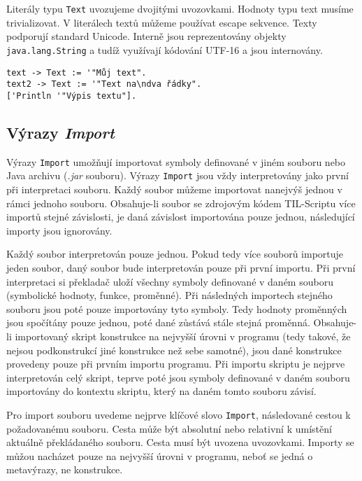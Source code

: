 Literály typu \lstinline{Text} uvozujeme dvojitými uvozovkami. Hodnoty typu text musíme
trivializovat. V literálech textů můžeme používat escape sekvence. Texty podporují standard
Unicode. Interně jsou reprezentovány objekty \lstinline{java.lang.String} a tudíž využívají
kódování UTF-16 a jsou internovány.

\begin{lstlisting}[caption={Příklad využití typu Text}]
text -> Text := '"Můj text".
text2 -> Text := '"Text na\ndva řádky".
['Println '"Výpis textu"].
\end{lstlisting}

\subsection{Výrazy \textit{Import}}

Výrazy \lstinline{Import} umožňují importovat symboly definované v jiném souboru nebo Java archivu
(\textit{.jar} souboru). Výrazy \lstinline{Import} jsou vždy interpretovány jako první při
interpretaci souboru. Každý soubor můžeme importovat nanejvýš jednou v rámci jednoho souboru.
Obsahuje-li soubor se zdrojovým kódem TIL-Scriptu více importů stejné závislosti, je daná závislost
importována pouze jednou, následující importy jsou ignorovány.

Každý soubor interpretován pouze jednou. Pokud tedy více souborů importuje jeden soubor, daný
soubor bude interpretován pouze při první importu. Při první interpretaci si překladač uloží
všechny symboly definované v daném souboru (symbolické hodnoty, funkce, proměnné). Při následných
importech stejného souboru jsou poté pouze importovány tyto symboly. Tedy hodnoty proměnných jsou
spočítány pouze jednou, poté dané zůstává stále stejná proměnná. Obsahuje-li importovaný skript
konstrukce na nejvyšší úrovni v programu (tedy takové, že nejsou podkonstrukcí jiné konstrukce než
sebe samotné), jsou dané konstrukce provedeny pouze při prvním importu programu. Při importu
skriptu je nejprve interpretován celý skript, teprve poté jsou symboly definované v daném souboru
importovány do kontextu skriptu, který na daném tomto souboru závisí.

Pro import souboru uvedeme nejprve klíčové slovo \lstinline{Import}, následované cestou
k požadovanému souboru. Cesta může být absolutní nebo relativní k umístění aktuálně překládaného
souboru. Cesta musí být uvozena uvozovkami. Importy se můžou nacházet pouze na nejvyšší úrovni
v programu, neboť se jedná o metavýrazy, ne konstrukce.

